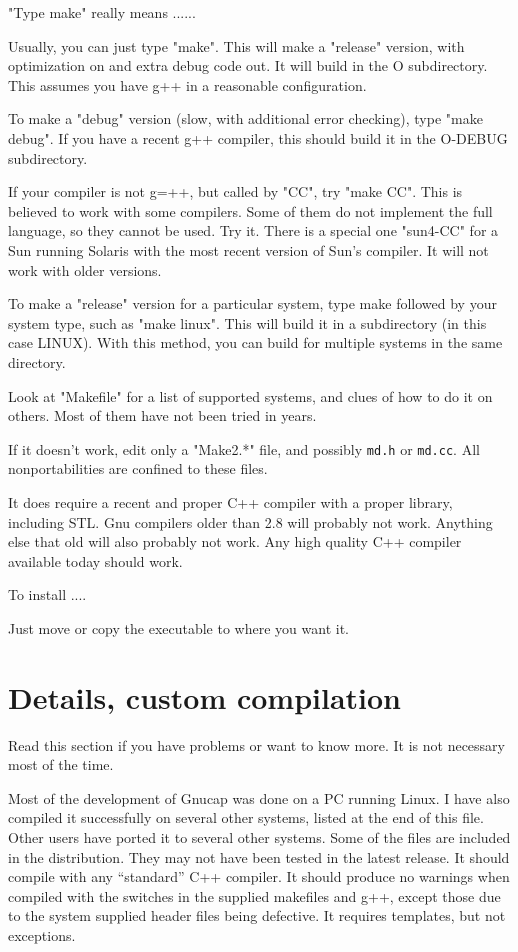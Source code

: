 "Type make" really means ......

Usually, you can just type "make".  This will make a "release"
version, with optimization on and extra debug code out.  It will build
in the O subdirectory.  This assumes you have g++ in a reasonable
configuration.

To make a "debug" version (slow, with additional error checking), type
"make debug".  If you have a recent g++ compiler, this should build it
in the O-DEBUG subdirectory.

If your compiler is not g=++, but called by "CC", try "make CC".  This
is believed to work with some compilers.  Some of them do not
implement the full language, so they cannot be used.  Try it.  There
is a special one "sun4-CC" for a Sun running Solaris with the most
recent version of Sun's compiler.  It will not work with older
versions.

To make a "release" version for a particular system, type make
followed by your system type, such as "make linux".  This will build
it in a subdirectory (in this case LINUX).  With this method, you can
build for multiple systems in the same directory.

Look at "Makefile" for a list of supported systems, and clues of how
to do it on others.  Most of them have not been tried in years.

If it doesn't work, edit only a "Make2.*" file, and possibly {\tt md.h} or
{\tt md.cc}.  All nonportabilities are confined to these files.

It does require a recent and proper C++ compiler with a proper
library, including STL.  Gnu compilers older than 2.8 will probably
not work.  Anything else that old will also probably not work.  Any
high quality C++ compiler available today should work.

To install ....

Just move or copy the executable to where you want it.

\section{Details, custom compilation}

Read this section if you have problems or want to know more.  It is
not necessary most of the time.

Most of the development of Gnucap was done on a PC running Linux.  I have
also compiled it successfully on several other systems, listed at the
end of this file.  Other users have ported it to several other
systems.  Some of the files are included in the distribution.  They
may not have been tested in the latest release.  It should compile
with any ``standard'' C++ compiler.  It should produce no warnings when
compiled with the switches in the supplied makefiles and g++, except
those due to the system supplied header files being defective.  It
requires templates, but not exceptions.

